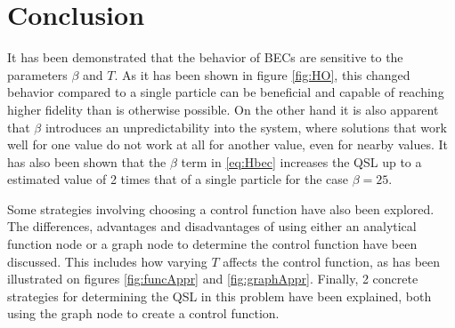 \documentclass[aps,pra,reprint,superscriptaddress]{revtex4-1}
\begin{document}
\section{\label{sec:conclusion}Conclusion}


It has been demonstrated that the behavior of BECs are sensitive to the parameters $\beta$ and $T$. As it has been shown in figure \ref{fig:HO}, this changed behavior compared to a single particle can be beneficial and capable of reaching higher fidelity than is otherwise possible. On the other hand it is also apparent that $\beta$ introduces an unpredictability into the system, where solutions that work well for one value do not work at all for another value, even for nearby values. It has also been shown that the $\beta$ term in \eqref{eq:Hbec} increases the QSL up to a estimated value of 2 times that of a single particle for the case $\beta=25$.

Some strategies involving choosing a control function have also been explored. The differences, advantages and disadvantages of using either an analytical function node or a graph node to determine the control function have been discussed. This includes how varying $T$ affects the control function, as has been illustrated on figures \ref{fig:funcAppr} and \ref{fig:graphAppr}. Finally, 2 concrete strategies for determining the QSL in this problem have been explained, both using the graph node to create a control function. 
%
\end{document}
